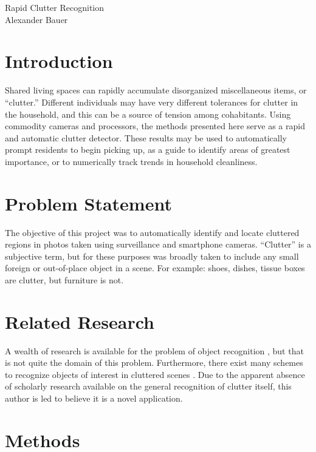 \documentclass[11pt]{article}
\begin{document}
\begin{center}
    {\LARGE Rapid Clutter Recognition} \\
    {\large Alexander Bauer}
\end{center}

\section*{Introduction}

Shared living spaces can rapidly accumulate disorganized miscellaneous items, or
``clutter.'' Different individuals may have very different tolerances for
clutter in the household, and this can be a source of tension among cohabitants.
Using commodity cameras and processors, the methods presented here serve as a
rapid and automatic clutter detector. These results may be used to automatically
prompt residents to begin picking up, as a guide to identify areas of
greatest importance, or to numerically track trends in household cleanliness.

\section*{Problem Statement}

The objective of this project was to automatically identify and locate cluttered
regions in photos taken using surveillance and smartphone cameras. ``Clutter''
is a subjective term, but for these purposes was broadly taken to include any
small foreign or out-of-place object in a scene. For example: shoes, dishes,
tissue boxes are clutter, but furniture is not.

\section*{Related Research}

A wealth of research is available for the problem of object
recognition \cite{Lowe99,Besl86,Torralba03,Torralba04}, but
that is not quite the domain of this problem. Furthermore, there exist many
schemes to recognize objects of interest in cluttered
scenes \cite{Mori03,Johnson99}. Due to the apparent absence of scholarly
research available on the general recognition of clutter itself, this author is
led to believe it is a novel application.

\section*{Methods}
\end{document}
